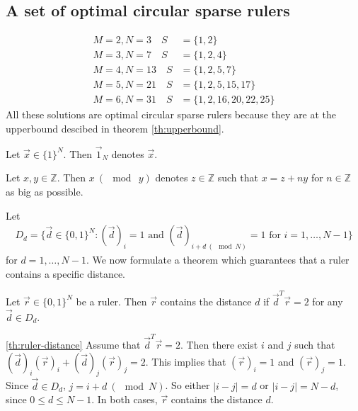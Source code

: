 \documentclass[a4paper, openany, oneside]{memoir}
\begin{document}
\subsection{A set of optimal circular sparse rulers}
\begin{align}
M=2,N=3  \quad S&=\{1,2\}\\
M=3,N=7  \quad S&=\{1,2,4\}\\
M=4,N=13 \quad S&=\{1,2,5,7\}\\
M=5,N=21 \quad S&=\{1,2,5,15,17\}\\
M=6,N=31 \quad S&=\{1,2,16,20,22,25\}
\end{align}
All these solutions are optimal circular sparse rulers because they are at the upperbound descibed in theorem \ref{th:upperbound}.

\begin{blockDefinition}
    Let $\vec{x} \in \{1\}^N$. Then $\vec{1}_N$ denotes $\vec{x}$.
\end{blockDefinition}

\begin{blockDefinition}[Modulo]
    Let $x,y \in \mathbb{Z}$. Then $x~(\mod~y)$ denotes $z \in \mathbb{Z}$ such that $x = z + ny$ for $n \in \mathbb{Z}$ as big as possible.
\end{blockDefinition}

Let
\begin{align*}
    D_d = \{\vec{d} \in \{0,1\}^N : (\vec{d})_i = 1 \text{ and } (\vec{d})_{i + d~(\mod N)} = 1 \text{ for } i = 1,\ldots,N-1\}
\end{align*}
for $d = 1,\ldots,N-1$. We now formulate a theorem which guarantees that a ruler contains a specific distance.

\begin{blockTheorem} \label{th:ruler-distance}\nolinebreak
    Let $\vec{r} \in \{0,1\}^N$ be a ruler. Then $\vec{r}$ contains the distance $d$ if $\vec{d}^T \vec{r} = 2$ for any $\vec{d} \in D_d$.\nolinebreak
\end{blockTheorem}

\begin{blockProofTheorem}{\ref{th:ruler-distance}}
    Assume that $\vec{d}^T\vec{r} = 2$. Then there exist $i$ and $j$ such that $(\vec{d})_i (\vec{r})_i + (\vec{d})_j (\vec{r})_j = 2$. This implies that $(\vec{r})_i = 1$ and $(\vec{r})_j = 1$. Since $\vec{d} \in D_d$, $j = i + d~(\mod N)$. So either $|i-j|=d$ or $|i-j| = N-d$, since $0 \le d \le N - 1$. In both cases, $\vec{r}$ contains the distance $d$. 
\end{blockProofTheorem}
\end{document}
